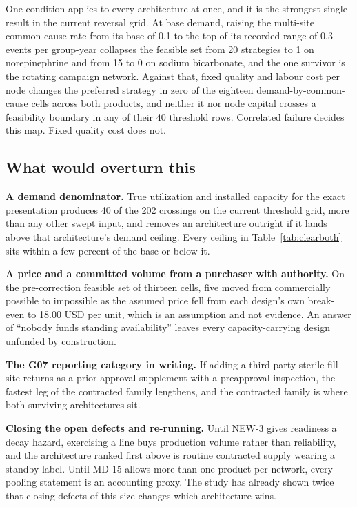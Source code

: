 One condition applies to every architecture at once, and it is the strongest single result in the
current reversal grid. At base demand, raising the multi-site common-cause rate from its base of 0.1
to the top of its recorded range of 0.3 events per group-year collapses the feasible set from 20
strategies to 1 on norepinephrine and from 15 to 0 on sodium bicarbonate, and the one survivor is the
rotating campaign network. Against that, fixed quality and labour cost per node changes the preferred
strategy in zero of the eighteen demand-by-common-cause cells across both products, and neither it
nor node capital crosses a feasibility boundary in any of their 40 threshold rows. Correlated failure
decides this map. Fixed quality cost does not.

\subsection{What would overturn this}

\textbf{A demand denominator.} True utilization and installed capacity for the exact presentation
produces 40 of the 202 crossings on the current threshold grid, more than any other swept input, and
removes an architecture outright if it lands above that architecture's demand ceiling. Every ceiling
in Table~\ref{tab:clearboth} sits within a few percent of the base or below it.

\textbf{A price and a committed volume from a purchaser with authority.} On the pre-correction
feasible set of thirteen cells, five moved from commercially possible to impossible as the assumed
price fell from each design's own break-even to 18.00 USD per unit, which is an assumption and not
evidence. An answer of ``nobody funds standing availability'' leaves every capacity-carrying design
unfunded by construction.

\textbf{The G07 reporting category in writing.} If adding a third-party sterile fill site returns as
a prior approval supplement with a preapproval inspection, the fastest leg of the contracted family
lengthens, and the contracted family is where both surviving architectures sit.

\textbf{Closing the open defects and re-running.} Until NEW-3 gives readiness a decay hazard,
exercising a line buys production volume rather than reliability, and the architecture ranked first
above is routine contracted supply wearing a standby label. Until MD-15 allows more than one product
per network, every pooling statement is an accounting proxy. The study has already shown twice that
closing defects of this size changes which architecture wins.

